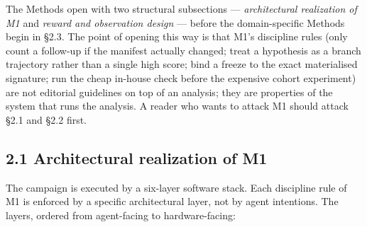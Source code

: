 \documentclass[11pt,letterpaper]{report}
\begin{document}

The Methods open with two structural subsections --- \emph{architectural realization of M1} and \emph{reward and observation design} --- before the domain-specific Methods begin in \S2.3. The point of opening this way is that M1's discipline rules (only count a follow-up if the manifest actually changed; treat a hypothesis as a branch trajectory rather than a single high score; bind a freeze to the exact materialised signature; run the cheap in-house check before the expensive cohort experiment) are not editorial guidelines on top of an analysis; they are properties of the system that runs the analysis. A reader who wants to attack M1 should attack \S2.1 and \S2.2 first.

\subsection*{2.1 Architectural realization of M1}

The campaign is executed by a six-layer software stack. Each discipline rule of M1 is enforced by a specific architectural layer, not by agent intentions. The layers, ordered from agent-facing to hardware-facing:
\end{document}
